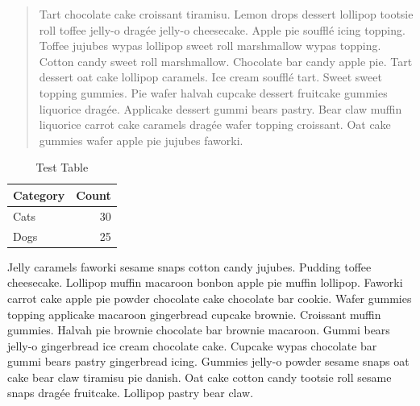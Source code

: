 \begin{quote}
Tart chocolate cake croissant tiramisu. Lemon drops dessert lollipop tootsie roll toffee jelly-o dragée jelly-o cheesecake. Apple pie soufflé icing topping. Toffee jujubes wypas lollipop sweet roll marshmallow wypas topping. Cotton candy sweet roll marshmallow. Chocolate bar candy apple pie. Tart dessert oat cake lollipop caramels. Ice cream soufflé tart. Sweet sweet topping gummies. Pie wafer halvah cupcake dessert fruitcake gummies liquorice dragée. Applicake dessert gummi bears pastry. Bear claw muffin liquorice carrot cake caramels dragée wafer topping croissant. Oat cake gummies wafer apple pie jujubes faworki.
\end{quote}

\begin{table}[hbt!]
   \centering
   \caption{Test Table}
   \label{tab:dummy:2}
   \begin{tabular}{l r}
      \hline
      Category & Count\\
      \hline
      Cats & 30\\
      Dogs & 25\\
      \hline
   \end{tabular}
\end{table}

Jelly caramels faworki sesame snaps cotton candy jujubes. Pudding toffee cheesecake. Lollipop muffin macaroon bonbon apple pie muffin lollipop. Faworki carrot cake apple pie powder chocolate cake chocolate bar cookie. Wafer gummies topping applicake macaroon gingerbread cupcake brownie. Croissant muffin gummies. Halvah pie brownie chocolate bar brownie macaroon. Gummi bears jelly-o gingerbread ice cream chocolate cake. Cupcake wypas chocolate bar gummi bears pastry gingerbread icing. Gummies jelly-o powder sesame snaps oat cake bear claw tiramisu pie danish. Oat cake cotton candy tootsie roll sesame snaps dragée fruitcake. Lollipop pastry bear claw.
